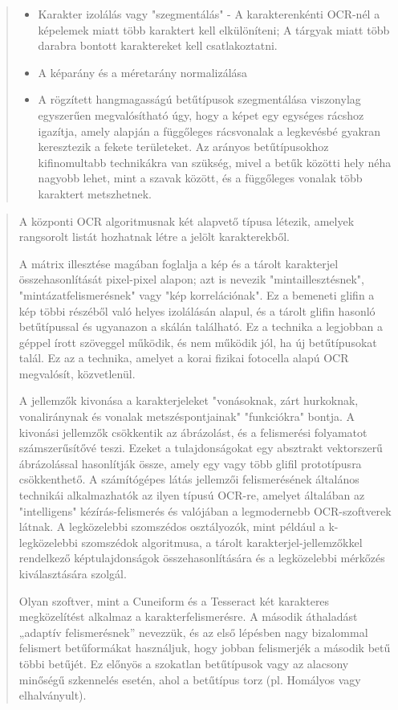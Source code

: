 \begin{quotation}
\begin{itemize}
		\item 	Karakter izolálás vagy "szegmentálás" - A karakterenkénti OCR-nél a képelemek miatt több karaktert kell elkülöníteni; A tárgyak miatt több darabra bontott karaktereket kell
		csatlakoztatni.
		
		\item A képarány és a méretarány normalizálása
		
		\item A rögzített hangmagasságú betűtípusok szegmentálása viszonylag egyszerűen megvalósítható úgy, hogy a képet egy egységes rácshoz igazítja, amely alapján a függőleges rácsvonalak a legkevésbé gyakran keresztezik a fekete területeket. Az arányos betűtípusokhoz kifinomultabb technikákra van szükség, mivel a betűk közötti hely néha nagyobb lehet, mint a szavak között, és a függőleges vonalak több karaktert metszhetnek.
	\end{itemize}
\end{quotation}

\begin{quotation}
	A központi OCR algoritmusnak két alapvető típusa létezik, amelyek rangsorolt listát hozhatnak létre a jelölt karakterekből.
	
	A mátrix illesztése magában foglalja a kép és a tárolt karakterjel összehasonlítását pixel-pixel alapon; azt is nevezik "mintaillesztésnek", "mintázatfelismerésnek" vagy "kép korrelációnak". Ez a bemeneti glifin a kép többi részéből való helyes izolálásán alapul, és a tárolt glifin hasonló betűtípussal és ugyanazon a skálán található. Ez a technika a legjobban a géppel írott szöveggel működik, és nem működik jól, ha új betűtípusokat talál. Ez az a technika, amelyet a korai fizikai fotocella alapú OCR megvalósít, közvetlenül.
	
	A jellemzők kivonása a karakterjeleket "vonásoknak, zárt hurkoknak, vonaliránynak és vonalak metszéspontjainak" "funkciókra" bontja. A kivonási jellemzők csökkentik az ábrázolást, és a felismerési folyamatot számszerűsítővé teszi. Ezeket a tulajdonságokat egy absztrakt vektorszerű ábrázolással hasonlítják össze, amely egy vagy több glifil prototípusra csökkenthető. A számítógépes látás jellemzői felismerésének általános technikái alkalmazhatók az ilyen típusú OCR-re, amelyet általában az "intelligens" kézírás-felismerés és valójában a legmodernebb OCR-szoftverek látnak. A legközelebbi szomszédos osztályozók, mint például a k-legközelebbi szomszédok algoritmusa, a tárolt karakterjel-jellemzőkkel rendelkező képtulajdonságok összehasonlítására és a legközelebbi mérkőzés kiválasztására szolgál.
	
	Olyan szoftver, mint a Cuneiform és a Tesseract két karakteres megközelítést alkalmaz a karakterfelismerésre. A második áthaladást „adaptív felismerésnek” nevezzük, és az első lépésben nagy bizalommal felismert betűformákat használjuk, hogy jobban felismerjék a második betű többi betűjét. Ez előnyös a szokatlan betűtípusok vagy az alacsony minőségű szkennelés esetén, ahol a betűtípus torz (pl. Homályos vagy elhalványult).
\end{quotation}


